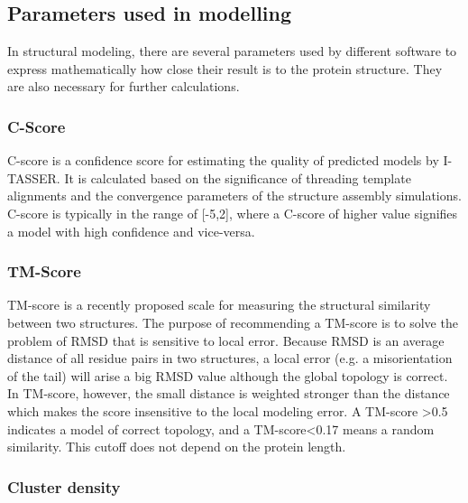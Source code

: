 \documentclass[11pt, letterpaper, portuguese]{article}
\begin{document}
    
    
    

\subsection{Parameters used in modelling} %

    \par{In structural modeling, there are several parameters used by different software to express mathematically how close their result is to the protein structure. They are also necessary for further calculations.}

\subsubsection{C-Score}

    \par{C-score is a confidence score for estimating the quality of predicted models by I-TASSER. It is calculated based on the significance of threading template alignments and the convergence parameters of the structure assembly simulations. C-score is typically in the range of [-5,2], where a C-score of higher value signifies a model with high confidence and vice-versa.}

\subsubsection{TM-Score}

    \par{TM-score is a recently proposed scale for measuring the structural similarity between two structures. The purpose of recommending a TM-score is to solve the problem of RMSD that is sensitive to local error. Because RMSD is an average distance of all residue pairs in two structures, a local error (e.g. a misorientation of the tail) will arise a big RMSD value although the global topology is correct. In TM-score, however, the small distance is weighted stronger than the distance which makes the score insensitive to the local modeling error. A TM-score >0.5 indicates a model of correct topology, and a TM-score<0.17 means a random similarity. This cutoff does not depend on the protein length.}

\subsubsection{Cluster density}
\end{document}

